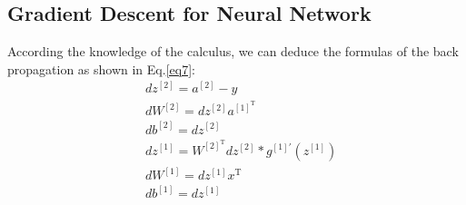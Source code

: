 \documentclass[a4paper]{article}
\begin{document}
\subsection{Gradient Descent for Neural Network}
According the knowledge of the calculus, we can deduce the 
formulas of the back propagation as shown in Eq.\ref{eq7}:
\begin{equation}
	\begin{aligned}
	& dz^{\left[2\right]} = a^{\left[2\right]}-y\\
	& dW^{\left[2\right]} = dz^{\left[2\right]}a^{\left[1\right]^\mathrm{T}}\\
	& db^{\left[2\right]} = dz^{\left[2\right]}\\
	& dz^{\left[1\right]} = W^{\left[2\right]^\mathrm{T}}dz^{\left[2\right]} \ast 
	g^{\left[1\right]\prime}\left(z^{\left[1\right]}\right)\\
	& dW^{\left[1\right]} = dz^{\left[1\right]}x^\mathrm{T}\\
	& db^{\left[1\right]} = dz^{\left[1\right]}
	\end{aligned}
	\label{eq7}
\end{equation}
\end{document}
